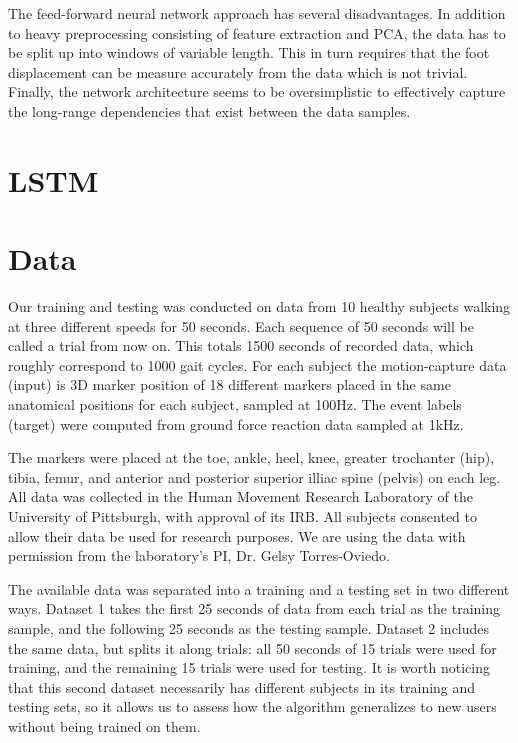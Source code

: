 \documentclass{acm_proc_article-sp}
\begin{document}
The feed-forward neural network approach has several disadvantages.
In addition to heavy preprocessing consisting of feature extraction and PCA, the 
data has to be split up into windows of variable length. 
This in turn requires that the foot displacement can be measure accurately from 
the data which is not trivial.
Finally, the network architecture seems to be oversimplistic to effectively
capture the long-range dependencies that exist between the data samples.


\section{LSTM}
\label{sec:LSTM}


\section{Data}
\label{sec:Data}
Our training and testing was conducted on data from 10 healthy subjects walking at three different speeds for 50 seconds. Each sequence of 50 seconds will be called a trial from now on. This totals 1500 seconds of recorded data, which roughly correspond to 1000 gait cycles.  For each subject the motion-capture data (input) is 3D marker position of 18 different markers placed in the same anatomical positions for each subject, sampled at 100Hz. The event labels (target) were computed from ground force reaction data sampled at 1kHz.

The markers were placed at the toe, ankle, heel, knee, greater trochanter (hip), tibia, femur, and anterior and posterior superior illiac spine (pelvis) on each leg.
All data was collected in the Human Movement Research Laboratory of the University of Pittsburgh, with approval of its IRB. All subjects consented to allow their data be used for research purposes. We are using the data with permission from the laboratory's PI, Dr. Gelsy Torres-Oviedo.

The available data was separated into a training and a testing set in two different ways. Dataset 1 takes the first 25 seconds of data from each trial as the training sample, and the following 25 seconds as the testing sample. Dataset 2 includes the same data, but splits it along trials: all 50 seconds of 15 trials were used for training, and the remaining 15 trials were used for testing. It is worth noticing that this second dataset necessarily has different subjects in its training and testing sets, so it allows us to assess how the algorithm generalizes to new users without being trained on them.
\end{document}
